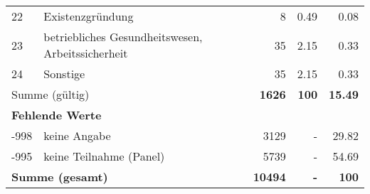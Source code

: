 \begin{longtable}{lXrrr}
        22 & \multicolumn{1}{X}{Existenzgründung} & %
          \num{8} &
          \num[round-mode=places,round-precision=2]{0.49} &
          \num[round-mode=places,round-precision=2]{0.08} \\

        23 & \multicolumn{1}{X}{betriebliches Gesundheitswesen, Arbeitssicherheit} & %
          \num{35} &
          \num[round-mode=places,round-precision=2]{2.15} &
          \num[round-mode=places,round-precision=2]{0.33} \\

        24 & \multicolumn{1}{X}{Sonstige} & %
          \num{35} &
          \num[round-mode=places,round-precision=2]{2.15} &
          \num[round-mode=places,round-precision=2]{0.33} \\

     \midrule
     \multicolumn{2}{l}{Summe (gültig)} &
       \textbf{\num{1626}} &
     \textbf{\num{100}} &
       \textbf{\num[round-mode=places,round-precision=2]{15.49}} \\
     \multicolumn{5}{l}{\textbf{Fehlende Werte}}\\
       -998 &
       keine Angabe &
         \num{3129} &
        - &
         \num[round-mode=places,round-precision=2]{29.82} \\
       -995 &
       keine Teilnahme (Panel) &
         \num{5739} &
        - &
         \num[round-mode=places,round-precision=2]{54.69} \\
     \midrule
     \multicolumn{2}{l}{\textbf{Summe (gesamt)}} &
          \textbf{\num{10494}} &
        \textbf{-} &
        \textbf{\num{100}} \\
     \bottomrule
     \end{longtable}
     
